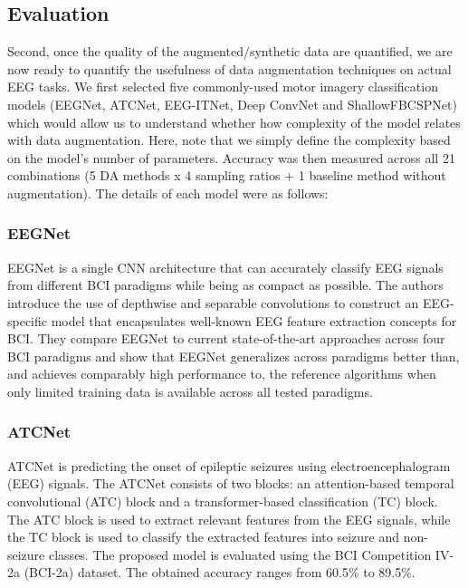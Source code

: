\documentclass[runningheads]{llncs}
\begin{document}
\subsection{Evaluation}

Second, once the quality of the augmented/synthetic data are quantified, we are now ready to quantify the usefulness of data augmentation techniques on actual EEG tasks.  We first selected five commonly-used motor imagery classification models (EEGNet, ATCNet, EEG-ITNet, Deep ConvNet and ShallowFBCSPNet) which would allow us to understand whether how complexity of the model relates with data augmentation.  Here, note that we simply define the complexity based on the model's number of parameters. Accuracy was then measured across all 21 combinations (5 DA methods x 4 sampling ratios + 1 baseline method without augmentation).  The details of each model were as follows:

\subsubsection{EEGNet}
EEGNet is a single CNN architecture that can accurately classify EEG signals from different BCI paradigms while being as compact as possible. The authors introduce the use of depthwise and separable convolutions to construct an EEG-specific model that encapsulates well-known EEG feature extraction concepts for BCI. They compare EEGNet to current state-of-the-art approaches across four BCI paradigms and show that EEGNet generalizes across paradigms better than, and achieves comparably high performance to, the reference algorithms when only limited training data is available across all tested paradigms.

\subsubsection{ATCNet}
ATCNet is predicting the onset of epileptic seizures using electroencephalogram (EEG) signals. The ATCNet consists of two blocks: an attention-based temporal convolutional (ATC) block and a transformer-based classification (TC) block. The ATC block is used to extract relevant features from the EEG signals, while the TC block is used to classify the extracted features into seizure and non-seizure classes. The proposed model is evaluated using the BCI Competition IV-2a (BCI-2a) dataset. The obtained accuracy ranges from 60.5\% to 89.5\%.
\end{document}
